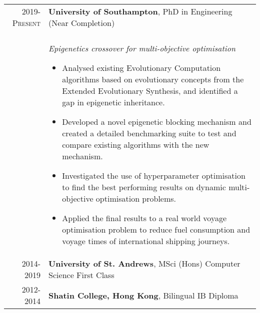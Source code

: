 \documentclass{article}
\begin{document}
\begin{tabular}{r|p{13.5cm}}
\textsc{2019-Present} & \textbf{University of Southampton}, PhD in Engineering (Near Completion)
\\
& \\
& \textit{Epigenetics crossover for multi-objective optimisation}


    \begin{itemize}
        \item Analysed existing Evolutionary Computation algorithms
    based on evolutionary concepts from the Extended Evolutionary Synthesis, and 
    identified a gap in epigenetic inheritance.
    \item Developed a novel epigenetic blocking mechanism and created a detailed benchmarking 
    suite to test and compare existing algorithms with the new mechanism.
    \item Investigated the use of hyperparameter optimisation to find the best 
    performing results on dynamic multi-objective optimisation problems.
    \item Applied the final results to a real world voyage optimisation
    problem to reduce fuel consumption and voyage times of international shipping journeys.
    \end{itemize}
\\
\textsc{2014-2019} & \textbf{University of St. Andrews}, MSci (Hons) Computer Science First Class
\\
\textsc{2012-2014} & \textbf{Shatin College, Hong Kong}, Bilingual IB Diploma
\end{tabular}
\end{document}
